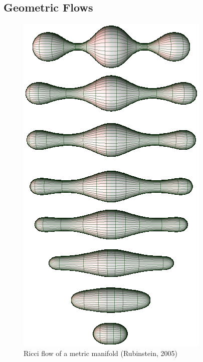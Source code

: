 \documentclass{article}
\begin{document}
\subsection{Geometric Flows}
    
    \begin{figure}
        \vspace{-0cm}
        \centering
        \includegraphics[scale=0.3]{ricci-flow.png}
        \\ Ricci flow of a metric manifold (Rubinstein, 2005)
    \end{figure}
    
\end{document}
